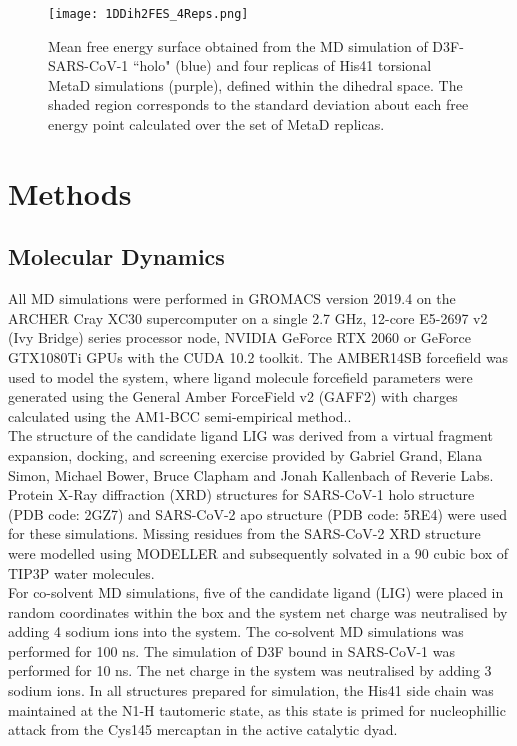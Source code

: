 \begin{figure}[!ht]
    \centering
    \texttt{[image: 1DDih2FES\_4Reps.png]}
    \caption{Mean free energy surface obtained from the MD simulation of D3F-SARS-CoV-1 ``holo" (blue) and four replicas of His41 torsional MetaD simulations (purple), defined within the \dihtwo dihedral space. The shaded region corresponds to the standard deviation about each free energy point calculated over the set of MetaD replicas.}
    \label{fig:1DPMFAll_Dihtwo}
\end{figure}
%
%
%
%
%
%
%
\section{Methods}

\subsection{Molecular Dynamics}
All MD simulations were performed in GROMACS version 2019.4 on the ARCHER Cray XC30 supercomputer on a single 2.7 GHz, 12-core E5-2697 v2 (Ivy Bridge) series processor node, NVIDIA GeForce RTX 2060 or GeForce GTX1080Ti GPUs with the CUDA 10.2 toolkit.  The AMBER14SB forcefield \cite{amberff14SB} was used to model the system, where ligand molecule forcefield parameters were generated using the General Amber ForceField v2 (GAFF2) with charges calculated using the AM1-BCC semi-empirical method.\cite{amber16}.\\

The structure of the candidate ligand LIG was derived from a virtual fragment expansion, docking, and screening exercise provided by Gabriel Grand, Elana Simon, Michael Bower, Bruce Clapham and Jonah Kallenbach of Reverie Labs.\cite{gabereverie} Protein X-Ray diffraction (XRD) structures for SARS-CoV-1  holo structure (PDB code: 2GZ7) \cite{2gz7} and SARS-CoV-2  apo structure (PDB code: 5RE4) were used for these simulations. Missing residues from the SARS-CoV-2 XRD structure were modelled using MODELLER \cite{modeller} and subsequently solvated in a 90 cubic box of TIP3P water molecules. \\

For co-solvent MD simulations, five of the candidate ligand (LIG) were placed in random coordinates within the box and the system net charge was neutralised by adding 4 sodium ions into the system. The co-solvent MD simulations was performed for 100 ns. The simulation of D3F bound in SARS-CoV-1  was performed for 10 ns. The net charge in the system was neutralised by adding 3 sodium ions. In all structures prepared for simulation, the His41 side chain was maintained at the N1-H tautomeric state, as this state is primed for nucleophillic attack from the Cys145 mercaptan in the active catalytic dyad.\\

